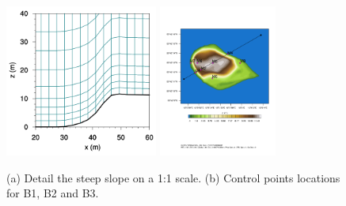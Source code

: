 \begin{figure}[H]
	\centering
	\includegraphics[height=5cm,trim={0cm 5mm 0cm 0cm},clip]{Imagenes/05/hd_mesh_50}
	\includegraphics[height=5cm,page=1,trim={3.4cm 9.3cm 1cm 4cm},clip]{Imagenes/05/bol_control_point.pdf}%
	
	\caption{(a) Detail the steep slope on a 1:1 scale. (b) Control points locations for B1, B2 and B3. }
	\label{fig:05_mesh_bol}
\end{figure}

